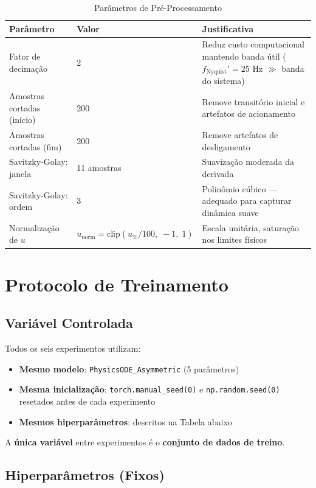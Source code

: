\documentclass[11pt,a4paper]{article}
\begin{document}
\begin{table}[hbt!]
\centering
\caption{Parâmetros de Pré-Processamento}
\vspace{0.2cm}
\begin{tabular}{lp{3.5cm}p{7cm}}
\toprule
\textbf{Parâmetro} & \textbf{Valor} & \textbf{Justificativa} \\
\midrule
Fator de decimação & 2 & Reduz custo computacional mantendo banda útil ($f_{\text{Nyquist}}' = 25$ Hz $\gg$ banda do sistema) \\
Amostras cortadas (início) & 200 & Remove transitório inicial e artefatos de acionamento \\
Amostras cortadas (fim) & 200 & Remove artefatos de desligamento \\
Savitzky-Golay: janela & 11 amostras & Suavização moderada da derivada \\
Savitzky-Golay: ordem & 3 & Polinômio cúbico — adequado para capturar dinâmica suave \\
Normalização de $u$ & $u_{\text{norm}} = \text{clip}(u_{\%} / 100,\; -1,\; 1)$ & Escala unitária, saturação nos limites físicos \\
\bottomrule
\end{tabular}
\end{table}

\section{Protocolo de Treinamento}

\subsection{Variável Controlada}

Todos os seis experimentos utilizam:
\begin{itemize}
    \item \textbf{Mesmo modelo}: \texttt{PhysicsODE\_Asymmetric} (5 parâmetros)
    \item \textbf{Mesma inicialização}: \texttt{torch.manual\_seed(0)} e \texttt{np.random.seed(0)} resetados antes de cada experimento
    \item \textbf{Mesmos hiperparâmetros}: descritos na Tabela abaixo
\end{itemize}

A \textbf{única variável} entre experimentos é o \textbf{conjunto de dados de treino}.

\subsection{Hiperparâmetros (Fixos)}
\end{document}
